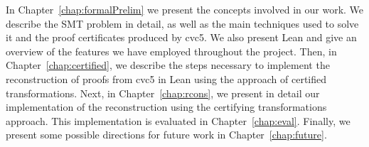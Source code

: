 In Chapter~\ref{chap:formalPrelim} we present the concepts involved in our work.
We describe the SMT problem in detail, as well as the main techniques used to solve
it and the proof certificates produced by cvc5. We also present Lean and give
an overview of the features we have employed throughout the project.
%
Then, in Chapter~\ref{chap:certified}, we describe the steps necessary to implement
the reconstruction of proofs from cvc5 in Lean using the approach of certified
transformations.
%
Next, in Chapter~\ref{chap:rcons}, we present in detail our implementation of the
reconstruction using the certifying transformations approach.
%
This implementation is evaluated in Chapter~\ref{chap:eval}.
%
Finally, we present some possible directions for future work in
Chapter~\ref{chap:future}.
